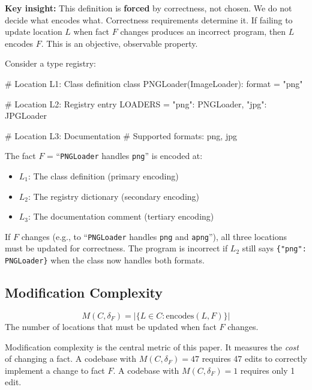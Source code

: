 \textbf{Key insight:} This definition is \textbf{forced} by correctness, not chosen. We do not decide what encodes what. Correctness requirements determine it. If failing to update location $L$ when fact $F$ changes produces an incorrect program, then $L$ encodes $F$. This is an objective, observable property.

\begin{example}\label{ex:encoding}
Consider a type registry:

\begin{code}
# Location L1: Class definition
class PNGLoader(ImageLoader):
    format = "png"

# Location L2: Registry entry
LOADERS = {"png": PNGLoader, "jpg": JPGLoader}

# Location L3: Documentation
# Supported formats: png, jpg
\end{code}

The fact $F$ = ``\texttt{PNGLoader} handles \texttt{png}'' is encoded at:
\begin{itemize}
\tightlist
\item $L_1$: The class definition (primary encoding)
\item $L_2$: The registry dictionary (secondary encoding)
\item $L_3$: The documentation comment (tertiary encoding)
\end{itemize}

If $F$ changes (e.g., to ``\texttt{PNGLoader} handles \texttt{png} and \texttt{apng}''), all three locations must be updated for correctness. The program is incorrect if $L_2$ still says \texttt{\{"png": PNGLoader\}} when the class now handles both formats.
\end{example}

\subsection{Modification Complexity}\label{sec:mod-complexity}

\begin{definition}\label{def:mod-complexity}
\[
M(C, \delta_F) = |\{L \in C : \text{encodes}(L, F)\}|
\]
The number of locations that must be updated when fact $F$ changes.
\end{definition}

Modification complexity is the central metric of this paper. It measures the \emph{cost} of changing a fact. A codebase with $M(C, \delta_F) = 47$ requires 47 edits to correctly implement a change to fact $F$. A codebase with $M(C, \delta_F) = 1$ requires only 1 edit.

